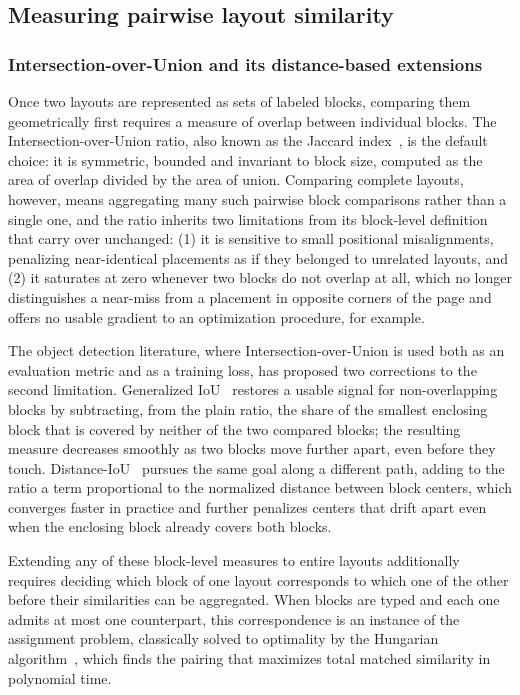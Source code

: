 \subsection{Measuring pairwise layout similarity}
\subsubsection{Intersection-over-Union and its distance-based extensions}
\label{sec:sota-geometric-similarity}

Once two layouts are represented as sets of labeled blocks, comparing them geometrically first requires a measure of overlap between individual blocks. The Intersection-over-Union ratio, also known as the Jaccard index~\cite{jaccard2021}, is the default choice: it is symmetric, bounded and invariant to block size, computed as the area of overlap divided by the area of union. Comparing complete layouts, however, means aggregating many such pairwise block comparisons rather than a single one, and the ratio inherits two limitations from its block-level definition that carry over unchanged: (1) it is sensitive to small positional misalignments, penalizing near-identical placements as if they belonged to unrelated layouts, and (2) it saturates at zero whenever two blocks do not overlap at all, which no longer distinguishes a near-miss from a placement in opposite corners of the page and offers no usable gradient to an optimization procedure, for example. 

The object detection literature, where Intersection-over-Union is used both as an evaluation metric and as a training loss, has proposed two corrections to the second limitation. Generalized IoU~\cite{Rezatofighi_2019_CVPR} restores a usable signal for non-overlapping blocks by subtracting, from the plain ratio, the share of the smallest enclosing block that is covered by neither of the two compared blocks; the resulting measure decreases smoothly as two blocks move further apart, even before they touch. Distance-IoU~\cite{zheng_distance-iou_2019} pursues the same goal along a different path, adding to the ratio a term proportional to the normalized distance between block centers, which converges faster in practice and further penalizes centers that drift apart even when the enclosing block already covers both blocks.

Extending any of these block-level measures to entire layouts additionally requires deciding which block of one layout corresponds to which one of the other before their similarities can be aggregated. When blocks are typed and each one admits at most one counterpart, this correspondence is an instance of the assignment problem, classically solved to optimality by the Hungarian algorithm~\cite{hungarian}, which finds the pairing that maximizes total matched similarity in polynomial time.

